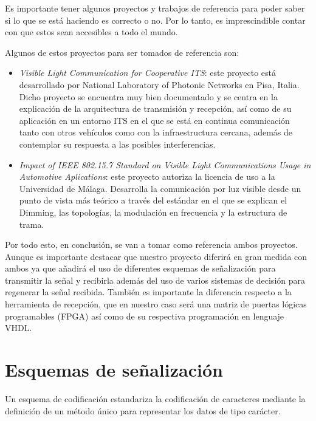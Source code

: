 Es importante tener algunos proyectos y trabajos de referencia para poder saber si lo que 
se está haciendo es correcto o no. Por lo tanto, es imprescindible contar con que estos 
sean accesibles a todo el mundo.

Algunos de estos proyectos para ser tomados de referencia son:

\begin{itemize}
    \item \textit{Visible Light Communication for Cooperative ITS}: este proyecto está 
    desarrollado por National Laboratory of Photonic Networks en Pisa, Italia. Dicho 
    proyecto se encuentra muy bien documentado y se centra en la explicación de la 
    arquitectura de transmisión y recepción, así como de su aplicación en un entorno ITS en 
    el que se está en continua comunicación tanto con otros vehículos como con la 
    infraestructura cercana, además de contemplar su respuesta a las posibles interferencias. \cite{falci}
    \item \textit{Impact of IEEE 802.15.7 Standard on Visible Light Communications Usage in 
    Automotive Aplications}: este proyecto autoriza la licencia de uso a la Universidad de 
    Málaga. Desarrolla la comunicación por luz visible desde un punto de vista más teórico 
    a través del estándar en el que se explican el Dimming, las topologías, la modulación 
    en frecuencia y la estructura de trama. \cite{caile}
\end{itemize}

Por todo esto, en conclusión, se van a tomar como referencia ambos proyectos. Aunque es 
importante destacar que nuestro proyecto diferirá en gran medida con ambos ya que añadirá 
el uso de diferentes esquemas de señalización para transmitir la señal y recibirla además 
del uso de varios sistemas de decisión para regenerar la señal recibida. También es 
importante la diferencia respecto a la herramienta 
de recepción, que en nuestro caso será una matriz de puertas lógicas programables (FPGA) 
así como de su respectiva programación en lenguaje VHDL.
\newpage
\section{Esquemas de señalización}
Un esquema de codificación estandariza la codificación de caracteres mediante la definición de un 
método único para representar los datos de tipo carácter. 

